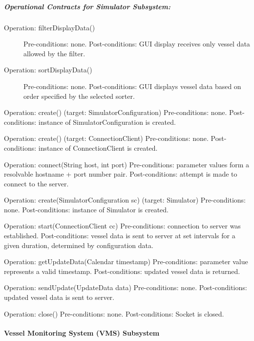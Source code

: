 \documentclass{article}
\begin{document}
\subparagraph{Operational Contracts for Simulator Subsystem:}

\begin{description}
    \item[Operation: filterDisplayData()] Pre-conditions: none.\newline
  Post-conditions: GUI display receives only vessel data allowed by the filter.
    \item[Operation: sortDisplayData()] Pre-conditions: none.\newline
  Post-conditions: GUI displays vessel data based on order specified by the selected sorter.
\end{description}

Operation: create() (target: SimulatorConfiguration)
Pre-conditions: none.
Post-conditions: instance of SimulatorConfiguration is created.

Operation: create() (target: ConnectionClient)
Pre-conditions: none.
Post-conditions: instance of ConnectionClient is created.

Operation: connect(String host, int port)
Pre-conditions: parameter values form a resolvable hostname + port number pair.
Post-conditions: attempt is made to connect to the server.

Operation: create(SimulatorConfiguration sc) (target: Simulator)
Pre-conditions: none.
Post-conditions: instance of Simulator is created.

Operation: start(ConnectionClient cc)
Pre-conditions: connection to server was established.
Post-conditions: vessel data is sent to server at set intervals for a given duration, determined by configuration data.

Operation: getUpdateData(Calendar timestamp)
Pre-conditions: parameter value represents a valid timestamp.
Post-conditions: updated vessel data is returned.

Operation: sendUpdate(UpdateData data)
Pre-conditions: none.
Post-conditions: updated vessel data is sent to server.

Operation: close()
Pre-conditions: none.
Post-conditions: Socket is closed.

\paragraph{Vessel Monitoring System (VMS) Subsystem}
\end{document}
